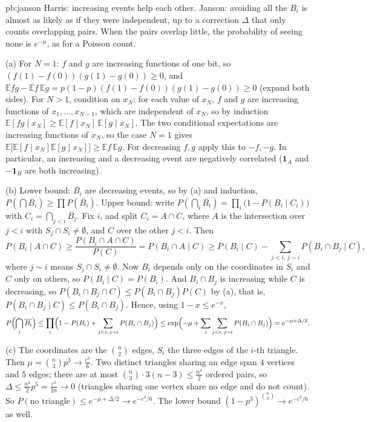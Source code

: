 \begin{solution}{pb:janson}
\idea Harris: increasing events help each other. Janson: avoiding all the $B_i$ is almost as likely as if they were independent, up to a correction $\Delta$ that only counts
overlapping pairs. When the pairs overlap little, the probability of seeing none is $e^{-\mu}$, as for a Poisson count.

\writeup (a) For $N=1$: $f$ and $g$ are increasing functions of one bit, so $(f(1)-f(0))(g(1)-g(0))\ge0$, and
$\mathbb Efg-\mathbb Ef\,\mathbb Eg=p(1-p)(f(1)-f(0))(g(1)-g(0))\ge0$ (expand both sides). For $N>1$, condition on $x_N$: for each value of $x_N$, $f$ and $g$ are increasing
functions of $x_1,\dots,x_{N-1}$, which are independent of $x_N$, so by induction $\mathbb E[fg\mid x_N]\ge\mathbb E[f\mid x_N]\,\mathbb E[g\mid x_N]$. The two conditional expectations are
increasing functions of $x_N$, so the case $N=1$ gives $\mathbb E\bigl[\mathbb E[f\mid x_N]\mathbb E[g\mid x_N]\bigr]\ge\mathbb Ef\,\mathbb Eg$. For decreasing $f,g$ apply this to $-f,-g$. In particular,
an increasing and a decreasing event are negatively correlated ($\mathbf 1_A$ and $-\mathbf 1_B$ are both increasing).

(b) Lower bound: $\overline{B_i}$ are decreasing events, so by (a) and induction, $P(\bigcap\overline{B_i})\ge\prod P(\overline{B_i})$. Upper bound: write
$P(\bigcap_i\overline{B_i})=\prod_i\bigl(1-P(B_i\mid C_i)\bigr)$ with $C_i=\bigcap_{j<i}\overline{B_j}$. Fix $i$, and split $C_i=A\cap C$, where $A$ is the intersection over $j<i$
with $S_j\cap S_i\ne\emptyset$, and $C$ over the other $j<i$. Then
\[
P(B_i\mid A\cap C)\ge\frac{P(B_i\cap A\cap C)}{P(C)}=P(B_i\cap A\mid C)\ge P(B_i\mid C)-\sum_{j<i,\,j\sim i}P(B_i\cap B_j\mid C),
\]
where $j\sim i$ means $S_j\cap S_i\ne\emptyset$. Now $B_i$ depends only on the coordinates in $S_i$ and $C$ only on others, so $P(B_i\mid C)=P(B_i)$. And $B_i\cap B_j$ is increasing
while $C$ is decreasing, so $P(B_i\cap B_j\cap C)\le P(B_i\cap B_j)P(C)$ by (a), that is, $P(B_i\cap B_j\mid C)\le P(B_i\cap B_j)$. Hence, using $1-x\le e^{-x}$,
\[
P\Bigl(\bigcap_i\overline{B_i}\Bigr)\le\prod_i\Bigl(1-P(B_i)+\sum_{j<i,\,j\sim i}P(B_i\cap B_j)\Bigr)\le\exp\Bigl(-\mu+\sum_i\sum_{j<i,\,j\sim i}P(B_i\cap B_j)\Bigr)=e^{-\mu+\Delta/2}.
\]

(c) The coordinates are the $\binom n2$ edges, $S_i$ the three edges of the $i$-th triangle. Then $\mu=\binom n3p^3\to\frac{c^3}6$. Two distinct triangles sharing an edge span $4$
vertices and $5$ edges; there are at most $\binom n3\cdot3(n-3)\le\frac{n^4}2$ ordered pairs, so $\Delta\le\frac{n^4}2p^5=\frac{c^5}{2n}\to0$ (triangles sharing one vertex share no
edge and do not count). So $P(\text{no triangle})\le e^{-\mu+\Delta/2}\to e^{-c^3/6}$. The lower bound $(1-p^3)^{\binom n3}\to e^{-c^3/6}$ as well.


\end{solution}

